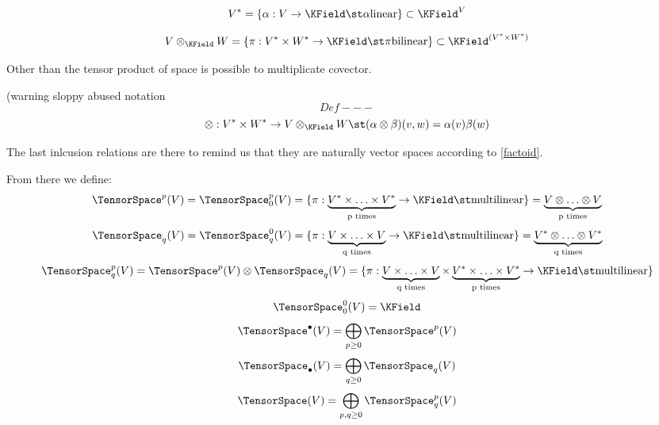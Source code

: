 \documentclass[a4paper,10pt]{scrartcl}
\begin{document}
\begin{displaymath}
 V^\ast = \{ \alpha : V \rightarrow \KField \st \alpha \textrm{linear} \} \subset \KField^V
\end{displaymath}

\begin{displaymath}
 V \otimes_\KField W = \{ \pi: V^\ast \times W^\ast \rightarrow \KField \st \pi \textrm{bilinear} \} \subset \KField ^{(V^\ast \times W^\ast)}
\end{displaymath}

Other than the tensor product of space is possible to multiplicate covector.

(warning sloppy abused notation
$$Def---$$
\begin{displaymath}
 \otimes : V^\ast \times W^\ast \rightarrow V \otimes_\KField W  \st (\alpha \otimes \beta ) ( v,w) = \alpha(v) \beta(w)
\end{displaymath}





The last inlcusion relations are there to remind us that they are naturally vector spaces according to \ref{factoid}.

From there we define:
\begin{displaymath}
 \TensorSpace^p (V) = \TensorSpace^p_0(V) = \{ \pi: \underbrace{V^\ast \times \ldots \times V^\ast}_\text{p times} \rightarrow \KField \st \textrm{multilinear} \} = \underbrace{V \otimes \ldots \otimes V}_\text{p times}
\end{displaymath}
\begin{displaymath}
 \TensorSpace_q (V) = \TensorSpace^0_q(V) = \{ \pi: \underbrace{V \times \ldots \times V}_\text{q times} \rightarrow \KField \st \textrm{multilinear} \} = \underbrace{V^\ast \otimes \ldots \otimes V^\ast}_\text{q times}
\end{displaymath}
\begin{displaymath}
 \TensorSpace^p_q (V) = \TensorSpace^p(V) \otimes \TensorSpace_q(V) = \{ \pi: \underbrace{V \times \ldots \times V}_\text{q times} \times \underbrace{V^\ast \times \ldots \times V^\ast}_\text{p times} \rightarrow \KField \st \textrm{multilinear} \}
\end{displaymath}
\begin{displaymath}
 \TensorSpace^0_0(V) = \KField
\end{displaymath}
\begin{displaymath}
 \TensorSpace^\bullet(V) = \bigoplus_{p \geq 0} \TensorSpace^p(V)
\end{displaymath}
\begin{displaymath}
 \TensorSpace_\bullet(V) = \bigoplus_{q \geq 0} \TensorSpace_q(V)
\end{displaymath}
\begin{displaymath}
 \TensorSpace(V) = \bigoplus_{p,q \geq 0} \TensorSpace^p_q(V)
\end{displaymath}
\end{document}
